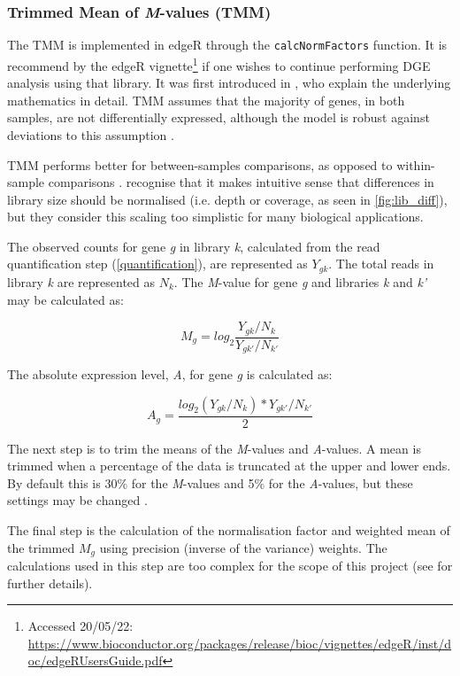 \subsubsection{Trimmed Mean of \textit{M}-values (TMM)}
\label{TMM}

The \ac{TMM} is implemented in edgeR \citep{edger} through the \texttt{calcNormFactors} function. It is recommend by the edgeR vignette\footnote{Accessed 20/05/22: \url{https://www.bioconductor.org/packages/release/bioc/vignettes/edgeR/inst/doc/edgeRUsersGuide.pdf}} if one wishes to continue performing \ac{DGE} analysis using that library. It was first introduced in \cite{robinson2010scaling}, who explain the underlying mathematics in detail. \ac{TMM} assumes that the majority of genes, in both samples, are not differentially expressed, although the model is robust against deviations to this assumption \citep{robinson2010scaling}. 

\ac{TMM} performs better for between-samples comparisons, as opposed to within-sample comparisons \citep{dundar2015introduction}. \cite{robinson2010scaling} recognise that it makes intuitive sense that differences in library size should be normalised (i.e. depth or coverage, as seen in \autoref{fig:lib_diff}), but they consider this scaling too simplistic for many biological applications. 

The observed counts for gene \textit{g} in library \textit{k}, calculated from the read quantification step (\autoref{quantification}), are represented as $Y_{gk}$. The total reads in library \textit{k} are represented as $N_k$. The  \textit{M}-value for gene \textit{g} and libraries \textit{k} and \textit{k'} may be calculated as:

$$ M_g = log_2 \frac{Y_{gk}/N_k}{Y_{gk'}/N_{k'}}$$

The absolute expression level, \textit{A}, for gene \textit{g} is calculated as:

$$A_g = \frac{log_2(Y_{gk}/N_k)*Y_{gk'}/N_{k'}}{2}$$

The next step is to trim the means of the \textit{M}-values and \textit{A}-values. A mean is trimmed when a percentage of the data is truncated at the upper and lower ends. By default this is 30\% for the \textit{M}-values and 5\% for the \textit{A}-values, but these settings may be changed \citep{robinson2010scaling}. 

The final step is the calculation of the normalisation factor and weighted mean of the trimmed $M_g$ using precision (inverse of the variance) weights. The calculations used in this step are too complex for the scope of this project (see \cite{robinson2010scaling} for further details). 


